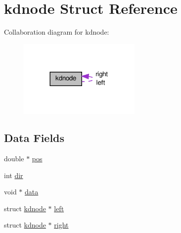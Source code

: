 \hypertarget{a00009}{\section{kdnode \-Struct \-Reference}
\label{da/da0/a00009}
}


\-Collaboration diagram for kdnode\-:\nopagebreak
\begin{figure}[H]
\begin{center}
\leavevmode
\includegraphics[width=168pt]{d8/d41/a00038}
\end{center}
\end{figure}
\subsection*{\-Data \-Fields}
\begin{DoxyCompactItemize}
\item 
double $\ast$ \hyperlink{a00009_a1a6076b5177bd7af0d55bc0e8c21fde3_a1a6076b5177bd7af0d55bc0e8c21fde3}{pos}
\item 
int \hyperlink{a00009_a851cf68c8f607573c1a5e987784c83f6_a851cf68c8f607573c1a5e987784c83f6}{dir}
\item 
void $\ast$ \hyperlink{a00009_a735984d41155bc1032e09bece8f8d66d_a735984d41155bc1032e09bece8f8d66d}{data}
\item 
struct \hyperlink{a00009}{kdnode} $\ast$ \hyperlink{a00009_a77fe629b496db8e95613fa6520af4371_a77fe629b496db8e95613fa6520af4371}{left}
\item 
struct \hyperlink{a00009}{kdnode} $\ast$ \hyperlink{a00009_ad73ae7970017da6a7f7fafc2e889bb51_ad73ae7970017da6a7f7fafc2e889bb51}{right}
\end{DoxyCompactItemize}



